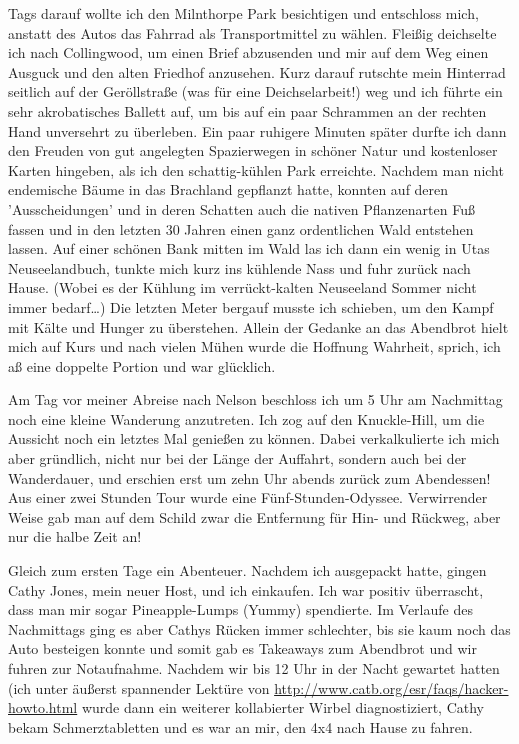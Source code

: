 Tags darauf wollte ich den Milnthorpe Park besichtigen und entschloss
mich, anstatt des Autos das Fahrrad als Transportmittel zu wählen.
Fleißig deichselte ich nach Collingwood, um einen Brief abzusenden und
mir auf dem Weg einen Ausguck und den alten Friedhof anzusehen. Kurz
darauf rutschte mein Hinterrad seitlich auf der Geröllstraße (was für
eine Deichselarbeit!) weg und ich führte ein sehr akrobatisches Ballett
auf, um bis auf ein paar Schrammen an der rechten Hand unversehrt zu
überleben. Ein paar ruhigere Minuten später durfte ich dann den Freuden
von gut angelegten Spazierwegen in schöner Natur und kostenloser Karten
hingeben, als ich den schattig-kühlen Park erreichte. Nachdem man nicht
endemische Bäume in das Brachland gepflanzt hatte, konnten auf deren
'Ausscheidungen' und in deren Schatten auch die nativen Pflanzenarten
Fuß fassen und in den letzten 30 Jahren einen ganz ordentlichen Wald
entstehen lassen. Auf einer schönen Bank mitten im Wald las ich dann ein
wenig in Utas Neuseelandbuch, tunkte mich kurz ins kühlende Nass und
fuhr zurück nach Hause. (Wobei es der Kühlung im verrückt-kalten
Neuseeland Sommer nicht immer bedarf\ldots) Die letzten Meter bergauf
musste ich schieben, um den Kampf mit Kälte und Hunger zu überstehen.
Allein der Gedanke an das Abendbrot hielt mich auf Kurs und nach vielen
Mühen wurde die Hoffnung Wahrheit, sprich, ich aß eine doppelte Portion
und war glücklich.

Am Tag vor meiner Abreise nach Nelson beschloss ich um 5 Uhr am
Nachmittag noch eine kleine Wanderung anzutreten. Ich zog auf den
Knuckle-Hill, um die Aussicht noch ein letztes Mal genießen zu können.
Dabei verkalkulierte ich mich aber gründlich, nicht nur bei der Länge
der Auffahrt, sondern auch bei der Wanderdauer, und erschien erst um
zehn Uhr abends zurück zum Abendessen! Aus einer zwei Stunden Tour wurde
eine Fünf-Stunden-Odyssee. Verwirrender Weise gab man auf dem Schild
zwar die Entfernung für Hin- und Rückweg, aber nur die halbe Zeit an!

Gleich zum ersten Tage ein Abenteuer. Nachdem ich ausgepackt hatte,
gingen Cathy Jones, mein neuer Host, und ich einkaufen. Ich war positiv
überrascht, dass man mir sogar Pineapple-Lumps (Yummy) spendierte. Im
Verlaufe des Nachmittags ging es aber Cathys Rücken immer schlechter,
bis sie kaum noch das Auto besteigen konnte und somit gab es Takeaways
zum Abendbrot und wir fuhren zur Notaufnahme. Nachdem wir bis 12 Uhr in
der Nacht gewartet hatten (ich unter äußerst spannender Lektüre von
\url{http://www.catb.org/esr/faqs/hacker-howto.html}
wurde dann ein weiterer kollabierter Wirbel diagnostiziert, Cathy bekam
Schmerztabletten und es war an mir, den 4x4 nach Hause zu fahren.

